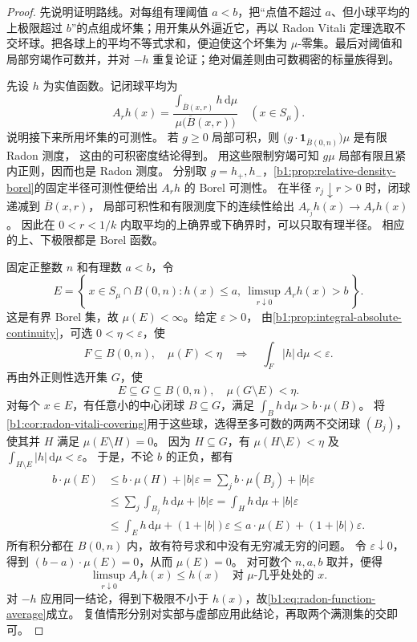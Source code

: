 \begin{proof}
先说明证明路线。对每组有理阈值 \(a<b\)，把“点值不超过 \(a\)、但小球平均的上极限超过 \(b\)”的点组成坏集；用开集从外逼近它，再以 Radon Vitali 定理选取不交坏球。把各球上的平均不等式求和，便迫使这个坏集为 \(\mu\)-零集。最后对阈值和局部穷竭作可数并，并对 \(-h\) 重复论证；绝对偏差则由可数稠密的标量族得到。

先设 \(h\) 为实值函数。记闭球平均为
\[
 A_rh(x)=\frac{\int_{\overline B(x,r)}h\,\mathrm d\mu}
                    {\mu\bigl(\overline B(x,r)\bigr)}
 \quad(x\in S_\mu).
\]
说明接下来所用坏集的可测性。
若 \(g\geq0\) 局部可积，则 \(\bigl(g\cdot\mathbf1_{\overline B(0,n)}\bigr)\mu\) 是有限 Radon 测度，
这由的可积密度结论得到。
用这些限制穷竭可知 \(g\mu\) 局部有限且紧内正则，因而也是 Radon 测度。
分别取 \(g=h_+,h_-\)，\cref{b1:prop:relative-density-borel}的固定半径可测性便给出 \(A_rh\) 的 Borel 可测性。
在半径 \(r_j\downarrow r>0\) 时，闭球递减到 \(\overline B(x,r)\)，
局部可积性和有限测度下的连续性给出 \(A_{r_j}h(x)\to A_rh(x)\)。
因此在 \(0<r<1/k\) 内取平均的上确界或下确界时，可以只取有理半径。
相应的上、下极限都是 Borel 函数。

固定正整数 \(n\) 和有理数 \(a<b\)，令
\[
 E=\left\{\,x\in S_\mu\cap B(0,n):
 h(x)\leq a,\ \limsup_{r\downarrow0}A_rh(x)>b\,\right\}.
\]
这是有界 Borel 集，故 \(\mu(E)<\infty\)。给定 \(\varepsilon>0\)，
由\cref{b1:prop:integral-absolute-continuity}，可选 \(0<\eta<\varepsilon\)，使
\[
 F\subseteq B(0,n),\quad\mu(F)<\eta
 \quad\Longrightarrow\quad\int_F|h|\,\mathrm d\mu<\varepsilon.
\]
再由外正则性选开集 \(G\)，使
\[
 E\subseteq G\subseteq B(0,n),\quad\mu(G\setminus E)<\eta.
\]
对每个 \(x\in E\)，有任意小的中心闭球 \(B\subseteq G\)，满足
\(\int_Bh\,\mathrm d\mu>b\cdot\mu(B)\)。
将\cref{b1:cor:radon-vitali-covering}用于这些球，选得至多可数的两两不交闭球 \((B_j)\)，
使其并 \(H\) 满足 \(\mu(E\setminus H)=0\)。
因为 \(H\subseteq G\)，有 \(\mu(H\setminus E)<\eta\) 及
\(\int_{H\setminus E}|h|\,\mathrm d\mu<\varepsilon\)。
于是，不论 \(b\) 的正负，都有
\[
 \begin{aligned}
 b\cdot\mu(E)
 &\leq b\cdot\mu(H)+|b|\varepsilon
 =\sum_jb\cdot\mu(B_j)+|b|\varepsilon\\
 &\leq\sum_j\int_{B_j}h\,\mathrm d\mu+|b|\varepsilon
 =\int_Hh\,\mathrm d\mu+|b|\varepsilon\\
 &\leq\int_Eh\,\mathrm d\mu+(1+|b|)\varepsilon
 \leq a\cdot\mu(E)+(1+|b|)\varepsilon.
 \end{aligned}
\]
所有积分都在 \(B(0,n)\) 内，故有符号求和中没有无穷减无穷的问题。
令 \(\varepsilon\downarrow0\)，得到 \((b-a)\cdot\mu(E)=0\)，从而 \(\mu(E)=0\)。
对可数个 \(n,a,b\) 取并，便得
\[
 \limsup_{r\downarrow0}A_rh(x)\leq h(x)
 \quad\text{对 }\mu\text{-几乎处处的 }x.
\]
对 \(-h\) 应用同一结论，得到下极限不小于 \(h(x)\)，故\eqref{b1:eq:radon-function-average}成立。
复值情形分别对实部与虚部应用此结论，再取两个满测集的交即可。


\end{proof}
